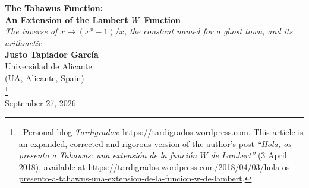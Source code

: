 \documentclass[11pt,a4paper]{article}
\theoremstyle{plain}
\theoremstyle{definition}
\theoremstyle{remark}
\begin{document}
\tableofcontents
\newpage

\begin{center}
    {\LARGE\bfseries The Tahawus Function:\\[4pt]
     An Extension of the Lambert \boldmath$W$\unboldmath\ Function}\\[14pt]
    {\large\itshape The inverse of $x \mapsto (x^{x}-1)/x$, the constant named for
     a ghost town, and its arithmetic}\\[18pt]
    {\large \textbf{Justo Tapiador García} \\ \small{Universidad de Alicante \\ (UA, Alicante, Spain)} \\ \thanks{\
    Personal blog \emph{Tardigrados}:
    \url{https://tardigrados.wordpress.com}. This article is an expanded,
    corrected and rigorous version of the author's post
    \emph{``Hola, os presento a Tahawus: una extensi\'on de la funci\'on $W$
    de Lambert''} (3 April 2018), available at
    \url{https://tardigrados.wordpress.com/2018/04/03/hola-os-presento-a-tahawus-una-extension-de-la-funcion-w-de-lambert}.}}\\[8pt]
    {\large September 27, 2026}
\end{center}
\end{document}
